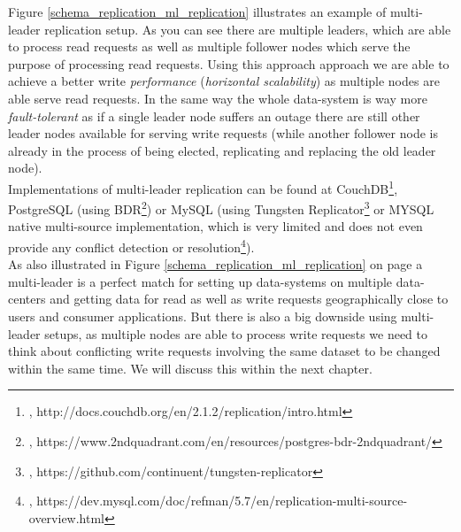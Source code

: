 {Figure \ref{schema_replication_ml_replication} illustrates an example of multi-leader replication setup. As you can see there are multiple leaders, which are able to process read requests as well as multiple follower nodes which serve the purpose of processing read requests. Using this approach approach we are able to achieve a better write \textit{performance} (\textit{horizontal scalability}) as multiple nodes are able serve read requests. In the same way the whole data-system is way more \textit{fault-tolerant} as if a single leader node suffers an outage there are still other leader nodes available for serving write requests (while another follower node is already in the process of being elected, replicating and replacing the old leader node).\\
Implementations of multi-leader replication can be found at CouchDB\footnote{\cite{CDBMM}, http://docs.couchdb.org/en/2.1.2/replication/intro.html}, PostgreSQL (using BDR\footnote{\cite{PSQLBDR}, https://www.2ndquadrant.com/en/resources/postgres-bdr-2ndquadrant/}) or MySQL (using Tungsten Replicator\footnote{\cite{TNGSTNREP}, https://github.com/continuent/tungsten-replicator} or MYSQL native multi-source implementation, which is very limited and does not even provide any conflict detection or resolution\footnote{\cite{MYSQLMS}, https://dev.mysql.com/doc/refman/5.7/en/replication-multi-source-overview.html}).\\
As also illustrated in Figure \ref{schema_replication_ml_replication} on page \pageref{schema_replication_ml_replication} a multi-leader is a perfect match for setting up data-systems on multiple data-centers and getting data for read as well as write requests geographically close to users and consumer applications. But there is also a big downside using multi-leader setups, as multiple nodes are able to process write requests we need to think about conflicting write requests involving the same dataset to be changed within the same time. We will discuss this within the next chapter.

}
